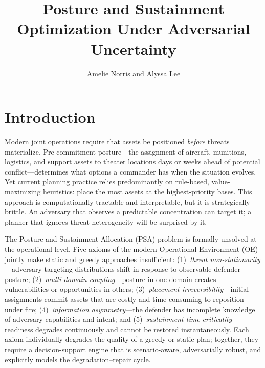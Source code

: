 \documentclass[11pt]{article}
\begin{document}
\title{Posture and Sustainment Optimization Under Adversarial Uncertainty}
\author{Amelie Norris and Alyssa Lee}
\date{}
\maketitle
\begin{abstract}
    
\end{abstract}

\newpage
\tableofcontents
\newpage


\section{Introduction}
\label{sec:intro}

Modern joint operations require that assets be positioned \emph{before}
threats materialize. Pre-commitment posture---the assignment of aircraft,
munitions, logistics, and support assets to theater locations days or
weeks ahead of potential conflict---determines what options a commander
has when the situation evolves. Yet current planning practice relies
predominantly on rule-based, value-maximizing heuristics: place the most
assets at the highest-priority bases. This approach is computationally
tractable and interpretable, but it is strategically brittle. An adversary
that observes a predictable concentration can target it; a planner that
ignores threat heterogeneity will be surprised by it.

The Posture and Sustainment Allocation (PSA) problem is formally
unsolved at the operational level. Five axioms of the modern Operational
Environment (OE) jointly make static and greedy approaches insufficient:
(1)~\emph{threat non-stationarity}---adversary targeting distributions
shift in response to observable defender posture;
(2)~\emph{multi-domain coupling}---posture in one domain creates
vulnerabilities or opportunities in others;
(3)~\emph{placement irreversibility}---initial assignments commit assets
that are costly and time-consuming to reposition under fire;
(4)~\emph{information asymmetry}---the defender has incomplete knowledge
of adversary capabilities and intent; and
(5)~\emph{sustainment time-criticality}---readiness degrades continuously
and cannot be restored instantaneously.
Each axiom individually degrades the quality of a greedy or static plan;
together, they require a decision-support engine that is scenario-aware,
adversarially robust, and explicitly models the degradation--repair cycle.
\end{document}
